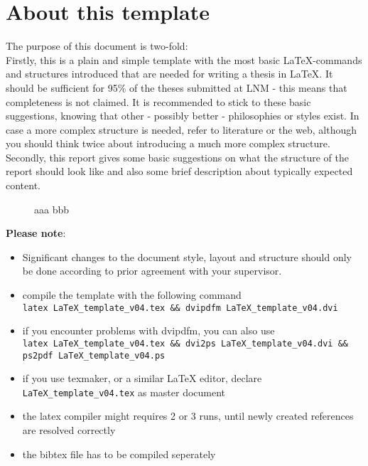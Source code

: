 \documentclass[../main.tex]{subfiles}
\begin{document}
\section{About this template}\label{sec:about}

The purpose of this document is two-fold:\\
Firstly, this is a plain and simple template with the most basic \LaTeX-commands and
structures introduced that are
needed for writing a thesis in \LaTeX. It should be sufficient for 95\% of
the theses submitted at LNM - this means that completeness is not claimed. It is recommended to
stick to these basic suggestions, knowing that other - possibly better -
philosophies or styles exist. In case a more complex structure is needed, refer to literature or the web, although you should think
twice about introducing a much more complex structure. \\
Secondly, this report gives some basic suggestions on what the structure of the report should look like and also some brief description about typically expected content.\\

\begin{figure}[h!]
	\begin{center}
        \caption[aaa]{aaa bbb}
		\label{aaa}
    \end{center}
\end{figure}

%
%

\textbf{Please note}: 
\begin{itemize}
 \item Significant changes to the document style, layout and structure should only be done according to prior agreement with your supervisor.
 \item compile the template with the following command \\
 \verb|latex LaTeX_template_v04.tex && dvipdfm LaTeX_template_v04.dvi|
 \item if you encounter problems with dvipdfm, you can also use \\
 \verb|latex LaTeX_template_v04.tex && dvi2ps LaTeX_template_v04.dvi &&|\\
 \verb|ps2pdf LaTeX_template_v04.ps| \\
 \item if you use texmaker, or a similar LaTeX editor, declare \verb|LaTeX_template_v04.tex| as master document   \\
 \item the latex compiler might requires 2 or 3 runs, until newly created references are resolved correctly \\
 \item the bibtex file has to be compiled seperately
\end{itemize}
\end{document}
